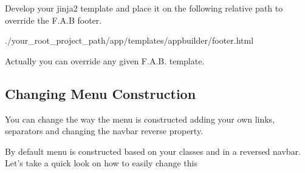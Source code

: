 \documentclass[letterpaper,10pt,english]{sphinxmanual}
\begin{document}
Develop your jinja2 template and place it on the following relative path to override the F.A.B footer.

./your\_root\_project\_path/app/templates/appbuilder/footer.html

Actually you can override any given F.A.B. template.


\subsection{Changing Menu Construction}
\label{customizing:changing-menu-construction}
You can change the way the menu is constructed adding your own links, separators and changing the navbar reverse property.

By default menu is constructed based on your classes and in a reversed navbar. Let's take a quick look on how to easily change this
\end{document}
